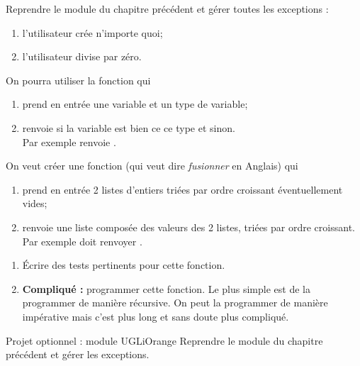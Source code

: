 \documentclass[a4paper,12pt,french]{book}
\begin{document}
\begin{exercice}[]
	Reprendre le module  du chapitre précédent et gérer toutes les exceptions :
	\begin{enumerate}[--]
		\item 	l'utilisateur crée n'importe quoi;
		\item 	l'utilisateur divise par zéro.
	\end{enumerate}
	On pourra utiliser la fonction  qui
	\begin{enumerate}[--]
		\item 	prend en entrée une variable et un type de variable;
		\item 	renvoie  si la variable est bien ce ce type et  sinon.\\
				Par exemple  renvoie .
	\end{enumerate}
\end{exercice}
\begin{exercice}[]
	On veut créer une fonction  (qui veut dire \textit{fusionner} en Anglais) qui
	\begin{enumerate}[--]
		\item 	prend en entrée 2 listes d'entiers triées par ordre croissant éventuellement vides;
		\item 	renvoie une liste composée des valeurs des 2 listes, triées par ordre croissant.
				Par exemple  doit renvoyer \pythoninline{[1, 3, 4, 5, 8, 10]}	.
	\end{enumerate}
	\begin{enumerate}[\bfseries 1.]
		\item 	\'Ecrire des tests pertinents pour cette fonction.
		\item 	\textbf{Compliqué :} programmer cette fonction. Le plus simple est de la programmer de manière récursive. On peut la programmer de manière impérative mais c'est plus long et sans doute plus compliqué.
	\end{enumerate}
\end{exercice}

\begin{encadrecolore}{Projet optionnel : module }{UGLiOrange}
Reprendre le module  du chapitre précédent et gérer les exceptions.
\end{encadrecolore}
\end{document}
